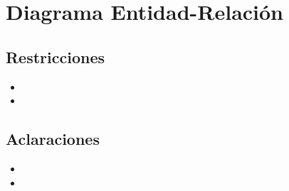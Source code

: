 \section{Diagrama Entidad-Relaci\'on}

\thispagestyle{empty}
  \begin{figure}[H] \centering
    {}
  \end{figure} 

\subsection{Restricciones}
  \begin{itemize}
    \item
    
    \item    
  \end{itemize}

\subsection{Aclaraciones}
  \begin{itemize}
    \item
    
    \item 
            
  \end{itemize}
